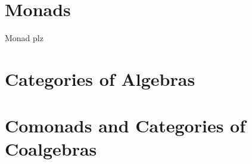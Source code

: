 \documentclass[../thesis.tex]{subfiles}
\begin{document}
    \section*{Monads}
        Monad plz

    \section*{Categories of Algebras}

    \section*{Comonads and Categories of Coalgebras}
\end{document}
